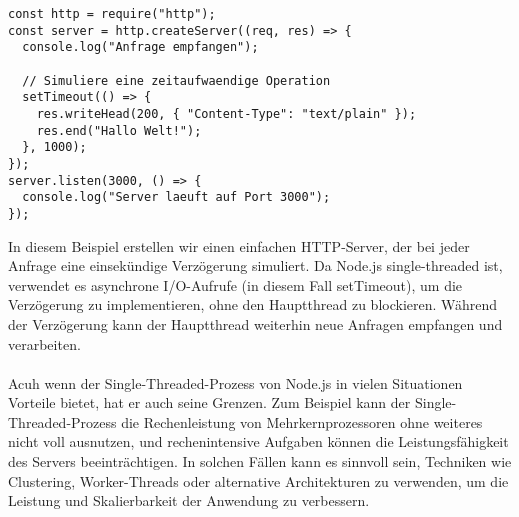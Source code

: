 \begin{lstlisting}[caption={Node.js Single Threaded},captionpos=b,label={lst:single}]
const http = require("http");
const server = http.createServer((req, res) => {
  console.log("Anfrage empfangen");

  // Simuliere eine zeitaufwaendige Operation
  setTimeout(() => {
    res.writeHead(200, { "Content-Type": "text/plain" });
    res.end("Hallo Welt!");
  }, 1000);
});
server.listen(3000, () => {
  console.log("Server laeuft auf Port 3000");
});
\end{lstlisting}
In diesem Beispiel erstellen wir einen einfachen HTTP-Server, der bei jeder Anfrage eine einsekündige Verzögerung simuliert. Da Node.js single-threaded ist, verwendet es asynchrone I/O-Aufrufe (in diesem Fall setTimeout), um die Verzögerung zu implementieren, ohne den Hauptthread zu blockieren. Während der Verzögerung kann der Hauptthread weiterhin neue Anfragen empfangen und verarbeiten.
\\\\
Acuh wenn der Single-Threaded-Prozess von Node.js in vielen Situationen Vorteile bietet, hat er auch seine Grenzen. Zum Beispiel kann der Single-Threaded-Prozess die Rechenleistung von Mehrkernprozessoren ohne weiteres nicht voll ausnutzen, und rechenintensive Aufgaben können die Leistungsfähigkeit des Servers beeinträchtigen. In solchen Fällen kann es sinnvoll sein, Techniken wie Clustering, Worker-Threads oder alternative Architekturen zu verwenden, um die Leistung und Skalierbarkeit der Anwendung zu verbessern.
